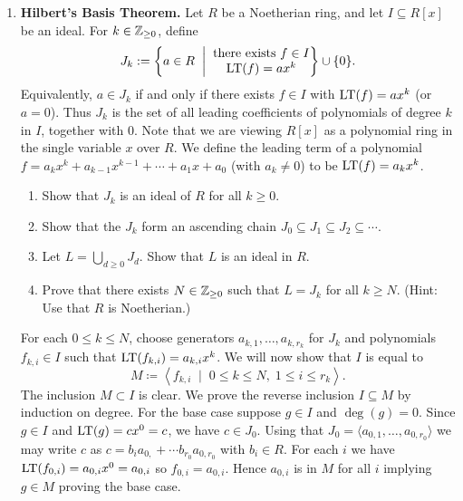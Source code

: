 \documentclass[12pt,reqno]{amsart}
\begin{document}
\begin{enumerate}[leftmargin=*]
\item \textbf{Hilbert's Basis Theorem.} Let $R$ be a Noetherian ring, and let $I\subseteq R[x]$ be an ideal. For $k\in \mathbb{Z}_{\geq0}$, define
  \[
J_k:=\left\{a\in R \;\; \bigg| \;\; \begin{matrix} \text{there exists $f\in I$} \\ \text{$\operatorname{LT}(f)  = ax^k$} \end{matrix} \right\} \cup\{0\}.
\]
Equivalently, $a\in J_k$ if and only if there exists $f\in I$ with $\operatorname{LT}(f)=ax^k$ (or $a=0$). Thus $J_k$ is the set of all leading coefficients of polynomials of degree $k$ in $I$, together with $0$. Note that we are viewing $R[x]$ as a polynomial ring in the single variable $x$ over $R$. We define the leading term of a polynomial $f = a_k x^k + a_{k-1}x^{k-1} + \cdots + a_1 x + a_0$ (with $a_k \neq 0$) to be $\operatorname{LT}(f) = a_k x^k$.
\begin{enumerate}[label=(\alph*),ref=\theenumi\alph*]
	\item Show that $J_k$ is an ideal of $R$ for all $k\geq0$. 
	\item\label{ex-part:hbt-chain} Show that the $J_{k}$ form an ascending chain $J_0\subseteq J_1\subseteq J_2\subseteq \cdots$. 
	\item Let $L=\bigcup_{d\geq 0} J_d$. Show that $L$ is an ideal in $R$.
	\item Prove that there exists $N \in \mathbb{Z}_{\geq0}$ such that $L = J_{k}$ for all $k\geq N$. (Hint: Use that $R$ is Noetherian.)
\end{enumerate}
For each $0\leq k\leq N$, choose generators $a_{k,1},\ldots,a_{k, r_k}$ for $J_k$ and polynomials $f_{k,i} \in I$ such that $\operatorname{LT}(f_{k,i}) = a_{k,i}x^k$. We will now show that $I$ is equal to
\[
M \coloneqq \left\langle f_{k,i} \;\; \big| \;\; 0 \leq k \leq N, \; 1 \leq i \leq r_k \right\rangle.
\]
The inclusion $M\subset I$ is clear. We prove the reverse inclusion $I\subseteq M$ by induction on degree. For the base case suppose $g \in I$ and $\deg(g) = 0$. Since $g \in I$ and $\operatorname{LT}(g) = cx^0=c$, we have $c\in J_{0}$. Using that $J_{0}=\langle a_{0,1},\ldots,a_{0,r_0}\rangle$ we may write $c$ as $c=b_{i}a_{0,}+\cdots b_{r_0}a_{0,r_0}$ with $b_i\in R$. For each $i$ we have $\operatorname{LT}(f_{0,i})=a_{0,i}x^{0}=a_{0,i}$ so $f_{0,i}=a_{0,i}$. Hence $a_{0,i}$ is in $M$ for all $i$ implying $g \in M$ proving the base case. 


\end{enumerate}
\end{document}
